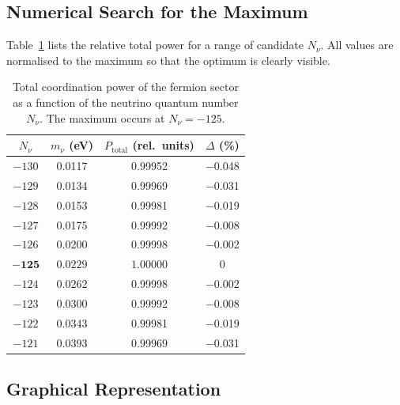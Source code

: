 \documentclass[12pt,a4paper]{article}
\begin{document}
	\subsection{Numerical Search for the Maximum}
	
	Table~\ref{tab:power} lists the relative total power for a range of candidate \(N_{\nu}\).  All values are normalised to the maximum so that the optimum is clearly visible.
	
	\begin{table}[htbp]
		\centering
		\caption{Total coordination power of the fermion sector as a function of the neutrino quantum number \(N_{\nu}\).  The maximum occurs at \(N_{\nu}=-125\).}
		\label{tab:power}
		\small
		\begin{tabular}{c c c c}
			\toprule
			\(N_{\nu}\) & \(m_{\nu}\) (eV) & \(P_{\mathrm{total}}\) (rel.\ units) & \(\Delta\) (\%) \\
			\midrule
			\(-130\) & 0.0117 & 0.99952 & $-$0.048 \\
			\(-129\) & 0.0134 & 0.99969 & $-$0.031 \\
			\(-128\) & 0.0153 & 0.99981 & $-$0.019 \\
			\(-127\) & 0.0175 & 0.99992 & $-$0.008 \\
			\(-126\) & 0.0200 & 0.99998 & $-$0.002 \\
			$\mathbf{-125}$ & $\mathbf{0.0229}$ & $\mathbf{1.00000}$ & 0 \\
			\(-124\) & 0.0262 & 0.99998 & $-$0.002 \\
			\(-123\) & 0.0300 & 0.99992 & $-$0.008 \\
			\(-122\) & 0.0343 & 0.99981 & $-$0.019 \\
			\(-121\) & 0.0393 & 0.99969 & $-$0.031 \\
			\bottomrule
		\end{tabular}
	\end{table}
	
	\subsection{Graphical Representation}
	
\end{document}
